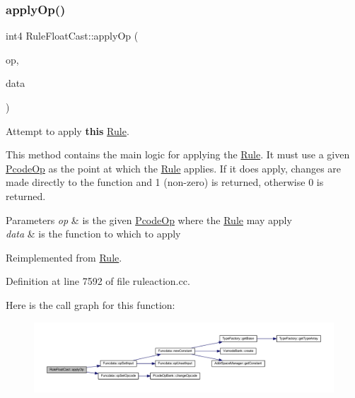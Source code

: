 \subsubsection{\texorpdfstring{applyOp()}{applyOp()}}
{\footnotesize\ttfamily int4 Rule\+Float\+Cast\+::apply\+Op (\begin{DoxyParamCaption}\item[{\mbox{\hyperlink{class_pcode_op}{Pcode\+Op}} $\ast$}]{op,  }\item[{\mbox{\hyperlink{class_funcdata}{Funcdata}} \&}]{data }\end{DoxyParamCaption})\hspace{0.3cm}{\ttfamily [virtual]}}



Attempt to apply {\bfseries{this}} \mbox{\hyperlink{class_rule}{Rule}}. 

This method contains the main logic for applying the \mbox{\hyperlink{class_rule}{Rule}}. It must use a given \mbox{\hyperlink{class_pcode_op}{Pcode\+Op}} as the point at which the \mbox{\hyperlink{class_rule}{Rule}} applies. If it does apply, changes are made directly to the function and 1 (non-\/zero) is returned, otherwise 0 is returned. 
\begin{DoxyParams}{Parameters}
{\em op} & is the given \mbox{\hyperlink{class_pcode_op}{Pcode\+Op}} where the \mbox{\hyperlink{class_rule}{Rule}} may apply \\
\hline
{\em data} & is the function to which to apply \\
\hline
\end{DoxyParams}


Reimplemented from \mbox{\hyperlink{class_rule_a4e3e61f066670175009f60fb9dc60848}{Rule}}.



Definition at line 7592 of file ruleaction.\+cc.

Here is the call graph for this function\+:
\nopagebreak
\begin{figure}[H]
\begin{center}
\leavevmode
\includegraphics[width=350pt]{class_rule_float_cast_aa220e61357bdc27e129e2f2dda089c1f_cgraph}
\end{center}
\end{figure}
\mbox{\label{class_rule_float_cast_ad95f614c4d32b7ec4ce070dff4f4b0d1}} 
